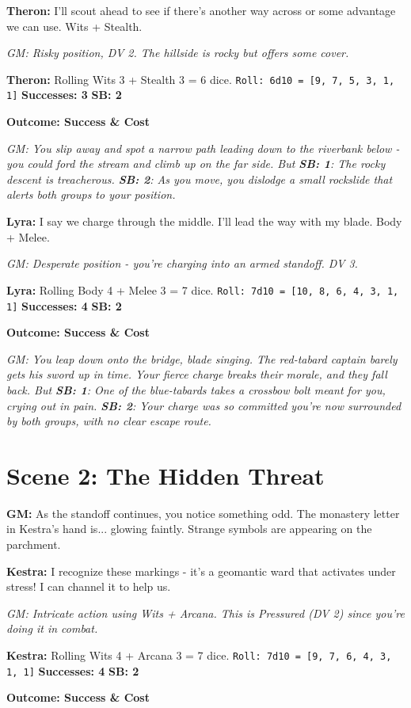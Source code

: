 \documentclass[11pt]{article}
\newcommand{\player}[1]{\textbf{#1:}}
\newcommand{\gm}[1]{\textit{GM: #1}}
\newcommand{\roll}[2]{\texttt{Roll: #1d10 = [#2]}}
\newcommand{\success}[1]{\textbf{Successes: #1}}
\newcommand{\cp}[1]{\textbf{SB: #1}}
\newcommand{\outcome}[1]{\textbf{Outcome: #1}}
\begin{document}
\player{Theron} I'll scout ahead to see if there's another way across or some advantage we can use. Wits + Stealth.

\gm{Risky position, DV 2. The hillside is rocky but offers some cover.}

\player{Theron} Rolling Wits 3 + Stealth 3 = 6 dice. \roll{6}{9, 7, 5, 3, 1, 1} \success{3} \cp{2}

\outcome{Success \& Cost}

\gm{You slip away and spot a narrow path leading down to the riverbank below - you could ford the stream and climb up on the far side. But \cp{1}: The rocky descent is treacherous. \cp{2}: As you move, you dislodge a small rockslide that alerts both groups to your position.}

\player{Lyra} I say we charge through the middle. I'll lead the way with my blade. Body + Melee.

\gm{Desperate position - you're charging into an armed standoff. DV 3.}

\player{Lyra} Rolling Body 4 + Melee 3 = 7 dice. \roll{7}{10, 8, 6, 4, 3, 1, 1} \success{4} \cp{2}

\outcome{Success \& Cost}

\gm{You leap down onto the bridge, blade singing. The red-tabard captain barely gets his sword up in time. Your fierce charge breaks their morale, and they fall back. But \cp{1}: One of the blue-tabards takes a crossbow bolt meant for you, crying out in pain. \cp{2}: Your charge was so committed you're now surrounded by both groups, with no clear escape route.}

\section*{Scene 2: The Hidden Threat}

\player{GM} As the standoff continues, you notice something odd. The monastery letter in Kestra's hand is... glowing faintly. Strange symbols are appearing on the parchment.

\player{Kestra} I recognize these markings - it's a geomantic ward that activates under stress! I can channel it to help us.

\gm{Intricate action using Wits + Arcana. This is Pressured (DV 2) since you're doing it in combat.}

\player{Kestra} Rolling Wits 4 + Arcana 3 = 7 dice. \roll{7}{9, 7, 6, 4, 3, 1, 1} \success{4} \cp{2}

\outcome{Success \& Cost}
\end{document}
